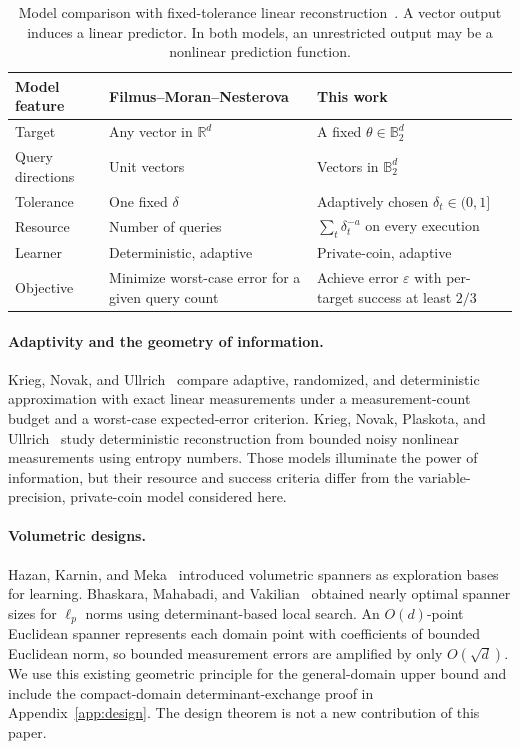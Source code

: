 \documentclass[11pt,a4paper]{article}
\newcommand{\R}{\mathbb R}
\newcommand{\B}{\mathbb B}
\newcommand{\eps}{\varepsilon}
\theoremstyle{definition}
\theoremstyle{remark}
\begin{document}
\begin{table}[t]
\centering
\caption{Model comparison with fixed-tolerance linear reconstruction~\cite{FMN26}. A vector output induces a linear predictor. In both models, an unrestricted output may be a nonlinear prediction function.}
\label{tab:model-comparison}
\small
\setlength{\tabcolsep}{4pt}
\renewcommand{\arraystretch}{1.15}
\begin{tabularx}{\textwidth}{@{}>{\raggedright\arraybackslash}p{} >{\raggedright\arraybackslash}X >{\raggedright\arraybackslash}X@{}}
\toprule
Model feature & Filmus--Moran--Nesterova~\cite{FMN26} & This work\\
\midrule
Target & Any vector in $\R^d$ & A fixed $\theta\in\B_2^d$\\
Query directions & Unit vectors & Vectors in $\B_2^d$\\
Tolerance & One fixed $\delta$ & Adaptively chosen $\delta_t\in(0,1]$\\
Resource & Number of queries & $\sum_t\delta_t^{-a}$ on every execution\\
Learner & Deterministic, adaptive & Private-coin, adaptive\\
Objective & Minimize worst-case error for a given query count & Achieve error $\eps$ with per-target success at least $2/3$\\
\bottomrule
\end{tabularx}
\end{table}

\paragraph{Adaptivity and the geometry of information.}
Krieg, Novak, and Ullrich~\cite{KNU25} compare adaptive, randomized, and deterministic approximation with exact linear measurements under a measurement-count budget and a worst-case expected-error criterion. Krieg, Novak, Plaskota, and Ullrich~\cite{KNPU26} study deterministic reconstruction from bounded noisy nonlinear measurements using entropy numbers. Those models illuminate the power of information, but their resource and success criteria differ from the variable-precision, private-coin model considered here.

\paragraph{Volumetric designs.}
Hazan, Karnin, and Meka~\cite{HKM14} introduced volumetric spanners as exploration bases for learning. Bhaskara, Mahabadi, and Vakilian~\cite{BMV23} obtained nearly optimal spanner sizes for $\ell_p$ norms using determinant-based local search. An $O(d)$-point Euclidean spanner represents each domain point with coefficients of bounded Euclidean norm, so bounded measurement errors are amplified by only $O(\sqrt d)$. We use this existing geometric principle for the general-domain upper bound and include the compact-domain determinant-exchange proof in Appendix~\ref{app:design}. The design theorem is not a new contribution of this paper.
\end{document}
